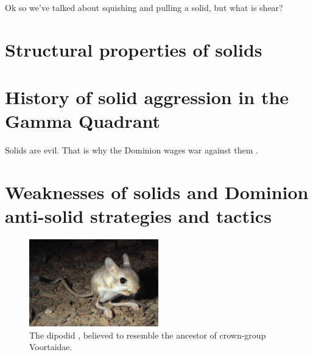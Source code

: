 Ok so we've talked about squishing and pulling a solid, but what is shear?

\section{Structural properties of solids}



\section{History of solid aggression in the Gamma Quadrant}
Solids are evil. That is why the Dominion  wages war against them \citep{Son-of-Mohg:2388}.
\section{Weaknesses of solids and Dominion anti-solid strategies and tactics}
\begin{figure}[h!]
 \label{jaculus}
 \centering
  \includegraphics[width=0.5\textwidth]{ch-solids/figures/jaculus.jpg}
 \caption{The dipodid , believed to resemble the ancestor of crown-group Voortaidae.}
\end{figure}




